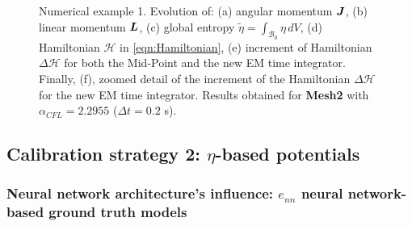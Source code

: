 \begin{figure}[hbtp]
\begin{tabular}{ccc}
	\end{tabular}
	\caption{Numerical example 1. Evolution of: (a) angular momentum $\boldsymbol{J}$, (b) linear momentum $\boldsymbol{L}$, (c) global entropy $\tilde{\eta}=\int_{\mathcal{B}_0}\eta\,dV$, (d) Hamiltonian $\mathcal{H}$  in \eqref{eqn:Hamiltonian}, (e) increment of Hamiltonian $\Delta\mathcal{H}$ for both the Mid-Point and the new EM time integrator.  Finally, (f), zoomed detail of the increment of the Hamiltonian  $\Delta\mathcal{H}$ for the new EM time integrator. Results obtained for \textbf{Mesh2} with $\alpha_{CFL}=2.2955$ ($\Delta t=0.2$ s).}
	\label{fig:example 1 energy balance}
\end{figure}


\subsection{Calibration strategy 2: $\eta$-based potentials}


\subsubsection{Neural network architecture's influence: $e_{nn}$ neural network-based ground truth models}


